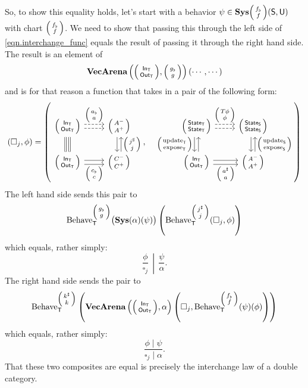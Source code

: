 \documentclass[DynamicalBook]{subfiles}
\begin{document}
\begin{itemize}
So, to show this equality holds, let's start with a behavior $\psi \in \Cat{Sys}\littlelens{f_{\flat}}{f}(\Sys{S}, \Sys{U})$ with chart $\littlelens{f_{\flat}}{f}$. We need to show that
passing this through the left side of \cref{eqn.interchange_func} equals the
result of passing it through the right hand side. The result is an element of
\[
\Cat{Vec}\Cat{Arena}\left( \littlelens{\In{T}}{\Out{T}},
      \littlelens{g_{\flat}}{g} \right)\left(\cdots, \cdots  \right)
\]
and is for that reason a function that takes in a pair of the following form:
\[
  (\square_j, \phi) = \left(  
    \begin{tikzcd}[ampersand replacement = \&]
      \lens{\In{T}}{\Out{T}} \ar[r, shift left, dashed, "\lens{a_{\flat}}{a}"] \ar[r, dashed, shift right] \ar[d, shift right,
      equals] \ar[d, shift left, equals] \&
      \lens{A^-}{A^+} \ar[d, shift left, leftarrow,
      "\lens{j^{\sharp}}{j}"] \ar[d, shift right]\\
      \lens{\In{T}}{\Out{T}} \ar[r, shift right, "\lens{c_{\flat}}{c}"'] \ar[r,
      shift left] \& \lens{C^-}{C^+}
    \end{tikzcd}, \quad
    \begin{tikzcd}[ampersand replacement = \&]
      \lens{\State{T}}{\State{T}} \ar[r, shift left, dashed, "\lens{T\phi}{\phi}"] \ar[r, dashed, shift right] \ar[d, shift right,
      "\lens{\update{T}}{\expose{T}}"'] \ar[d, shift left, leftarrow] \&
      \lens{\State{S}}{\State{S}} \ar[d, shift left, leftarrow,
      "\lens{\update{S}}{\expose{S}}"] \ar[d, shift right]\\
      \lens{\In{T}}{\Out{T}} \ar[r, shift right, "\lens{a^{\sharp}}{a}"'] \ar[r,
      shift left] \& \lens{A^-}{A^+}
    \end{tikzcd}
\right)
\]
The left hand side sends this pair to 
\[
\Fun{Behave}_{\Sys{T}}^{\littlelens{g_{\flat}}{g}}
  \big( \Cat{Sys}(\alpha)(\psi) \big)\left(
    \Fun{Behave}_{\Sys{T}}^{\littlelens{j^{\sharp}}{j}}(\square_j, \phi) \right) 
\]
which equals, rather simply:
\[
\left. \frac{\phi}{\square_j} \,\middle|\, \frac{\psi}{\alpha} \right. .
\]
The right hand side sends the pair to
\[
\Fun{Behave}_{\Sys{T}}^{\littlelens{k^{\sharp}}{k}}\left(
  \Cat{Vec}\Cat{Arena}\left( \littlelens{\In{T}}{\Out{T}}, \alpha \right)\left(
    \square_j, \Fun{Behave}_{\Sys{T}}^{\littlelens{f_{\flat}}{f}}(\psi)(\phi) \right) \right)
\]
which equals, rather simply:
\[
\frac{\phi \mid \psi}{\square_j \mid \alpha}.
\]
That these two composites are equal is precisely the interchange law of a double category.


\end{itemize}
\end{document}
